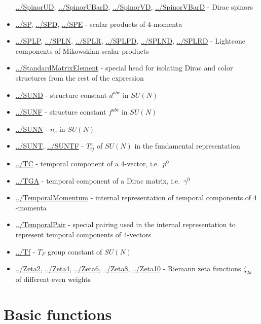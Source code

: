 \documentclass[../FeynCalcManual.tex]{subfiles}
\begin{document}
\begin{itemize}
  \hyperlink{../spinorud}{../SpinorUD},
  \hyperlink{../spinorubard}{../SpinorUBarD},
  \hyperlink{../spinorvd}{../SpinorVD},
  \hyperlink{../spinorvbard}{../SpinorVBarD} - Dirac spinors
\item
  \hyperlink{../sp}{../SP}, \hyperlink{../spd}{../SPD},
  \hyperlink{../spe}{../SPE} - scalar products of \(4\)-momenta
\item
  \hyperlink{../splp}{../SPLP}, \hyperlink{../spln}{../SPLN},
  \hyperlink{../splr}{../SPLR}, \hyperlink{../splpd}{../SPLPD},
  \hyperlink{../splnd}{../SPLND}, \hyperlink{../splrd}{../SPLRD} -
  Lightcone components of Mikowskian scalar products
\item
  \hyperlink{../standardmatrixelement}{../StandardMatrixElement} -
  special head for isolating Dirac and color structures from the rest of
  the expression
\item
  \hyperlink{../sund}{../SUND} - structure constant \(d^{abc}\) in
  \(SU(N)\)
\item
  \hyperlink{../sunf}{../SUNF} - structure constant \(f^{abc}\) in
  \(SU(N)\)
\item
  \hyperlink{../sunn}{../SUNN} - \(n_c\) in \(SU(N)\)
\item
  \hyperlink{../sunt}{../SUNT}, \hyperlink{../suntf}{../SUNTF} -
  \(T^a_{ij}\) of \(SU(N)\) in the fundamental representation
\item
  \hyperlink{../tc}{../TC} - temporal component of a \(4\)-vector,
  i.e.~\(p^0\)
\item
  \hyperlink{../tga}{../TGA} - temporal component of a Dirac matrix,
  i.e.~\(\gamma^0\)
\item
  \hyperlink{../temporalmomentum}{../TemporalMomentum} - internal
  representation of temporal components of \(4\)-momenta
\item
  \hyperlink{../temporalpair}{../TemporalPair} - special pairing used in
  the internal representation to represent temporal components of
  \(4\)-vectors
\item
  \hyperlink{../tf}{../Tf} - \(T_F\) group constant of \(SU(N)\)
\item
  \hyperlink{../zeta2}{../Zeta2}, \hyperlink{../zeta4}{../Zeta4},
  \hyperlink{../zeta6}{../Zeta6}, \hyperlink{../zeta8}{../Zeta8},
  \hyperlink{../zeta10}{../Zeta10} - Riemann zeta functions
  \(\zeta_{2k}\) of different even weights
\end{itemize}

\hypertarget{basic functions}{
\section{Basic functions}\label{basic functions}}
\end{document}
